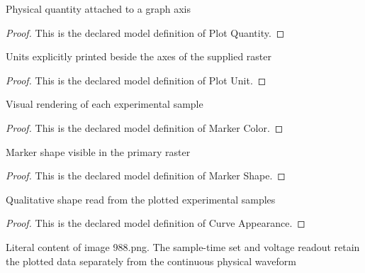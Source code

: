 \begin{definition}
  \label{def:physics:phyx-mini-0988:phyxminiproblems-problemphyxmini0988-plotquantity}
  Physical quantity attached to a graph axis
\end{definition}
\begin{proof}
  This is the declared model definition of Plot Quantity.
\end{proof}
\begin{definition}
  \label{def:physics:phyx-mini-0988:phyxminiproblems-problemphyxmini0988-plotunit}
  Units explicitly printed beside the axes of the supplied raster
\end{definition}
\begin{proof}
  This is the declared model definition of Plot Unit.
\end{proof}
\begin{definition}
  \label{def:physics:phyx-mini-0988:phyxminiproblems-problemphyxmini0988-markercolor}
  Visual rendering of each experimental sample
\end{definition}
\begin{proof}
  This is the declared model definition of Marker Color.
\end{proof}
\begin{definition}
  \label{def:physics:phyx-mini-0988:phyxminiproblems-problemphyxmini0988-markershape}
  Marker shape visible in the primary raster
\end{definition}
\begin{proof}
  This is the declared model definition of Marker Shape.
\end{proof}
\begin{definition}
  \label{def:physics:phyx-mini-0988:phyxminiproblems-problemphyxmini0988-curveappearance}
  Qualitative shape read from the plotted experimental samples
\end{definition}
\begin{proof}
  This is the declared model definition of Curve Appearance.
\end{proof}
\begin{definition}
  \label{def:physics:phyx-mini-0988:phyxminiproblems-problemphyxmini0988-solenoidvoltageplot}
  Literal content of image 988.png. The sample-time set and voltage readout retain the plotted data separately from the continuous physical waveform
\end{definition}
